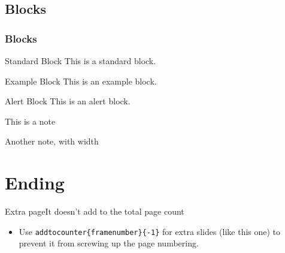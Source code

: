 \documentclass[11 pt,t,aspectratio=169]{beamer}
\begin{document}
\subsection{Blocks}
\begin{frame}
    \frametitle{Blocks}

    \begin{block}{Standard Block}
        This is a standard block.
    \end{block}

    \begin{exampleblock}{Example Block}
        This is an example block.
    \end{exampleblock}

    \begin{alertblock}{Alert Block}
        This is an alert block.
    \end{alertblock}

    \begin{noteblock}
        This is a note
    \end{noteblock}

    \begin{noteblock}[wd=5cm]
        Another note, with width
    \end{noteblock}

\end{frame}

\section{Ending}



\addtocounter{framenumber}{-1}
\begin{frame}[c]{Extra page}{It doesn't add to the total page count}
    \begin{itemize}
        \item Use \alert{\texttt{addtocounter\{framenumber\}\{-1\}}} for extra slides (like this one) to prevent it from screwing up the page numbering.
    \end{itemize}
\end{frame}
\end{document}
